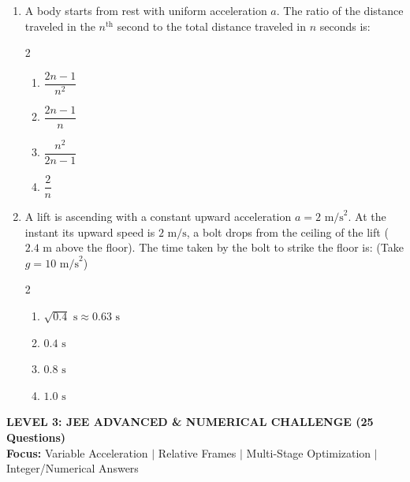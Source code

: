 \documentclass[11pt,a4paper]{article}
\begin{document}
\begin{enumerate}[label=\textbf{\textcolor{l2Amber}{Q\arabic*.}},leftmargin=24pt,itemsep=10pt,start=26]
  \item A body starts from rest with uniform acceleration $a$. The ratio of the distance traveled in the $n^{\text{th}}$ second to the total distance traveled in $n$ seconds is:
  \begin{multicols}{2}
  \begin{enumerate}[label=\textbf{\textcolor{primaryDark}{(\Alph*)}},itemsep=2pt]
    \item $\dfrac{2n - 1}{n^2}$
    \item $\dfrac{2n - 1}{n}$
    \item $\dfrac{n^2}{2n - 1}$
    \item $\dfrac{2}{n}$
  \end{enumerate}
  \end{multicols}

  \item A lift is ascending with a constant upward acceleration $a = 2\text{ m/s}^2$. At the instant its upward speed is $2\text{ m/s}$, a bolt drops from the ceiling of the lift ($2.4\text{ m}$ above the floor). The time taken by the bolt to strike the floor is: (Take $g = 10\text{ m/s}^2$)
  \begin{multicols}{2}
  \begin{enumerate}[label=\textbf{\textcolor{primaryDark}{(\Alph*)}},itemsep=2pt]
    \item $\sqrt{0.4}\text{ s} \approx 0.63\text{ s}$
    \item $0.4\text{ s}$
    \item $0.8\text{ s}$
    \item $1.0\text{ s}$
  \end{enumerate}
  \end{multicols}

\end{enumerate}

\newpage

\begin{tcolorbox}[l3banner]
  {\Large \textbf{\textsf{LEVEL 3: JEE ADVANCED \& NUMERICAL CHALLENGE (25 Questions)}}}\\[2pt]
  {\footnotesize \textbf{Focus:} Variable Acceleration $\vert$ Relative Frames $\vert$ Multi-Stage Optimization $\vert$ Integer/Numerical Answers}
\end{tcolorbox}
\vspace{6pt}
\end{document}
